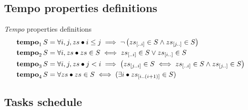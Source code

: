 \documentclass{beamer}
\newcommand{\sliceright}[2]{\ensuremath #1_{\left[..#2\right]}}
\newcommand{\sliceleft}[2]{\ensuremath #1_{\left[#2..\right]}}
\newcommand{\slice}[3]{\ensuremath #1_{\left[#2..#3\right]}}
\def\tempoop{\ensuremath\operatorname{\mathbf{tempo}}}
\newcommand{\tempo}[2][1-4]{\ensuremath\tempoop_{#1} #2}
\begin{document}
\subsection{Tempo properties definitions}

\begin{frame}[label=tempodetail]{\emph{Tempo} properties definitions}
	{\scriptsize\begin{align*}
			\tempo[1]{S} &= \forall i, j, zs \bullet
			  i \le j \implies
			  \lnot \left(
			    \sliceright{zs}{i} \in S \land \sliceleft{zs}{j} \in S
			  \right)\\
			\tempo[2]{S} &= \forall i, zs \bullet
			  zs \in S \iff
			  \sliceright{zs}{i} \in S \lor \sliceleft{zs}{i} \in S\\
			\tempo[3]{S} &= \forall i, j, zs \bullet
			  j < i \implies
			  \left(
			    \slice{zs}{j}{i} \in S \iff \sliceright{zs}{i} \in S \land \sliceleft{zs}{j} \in S
			  \right)\\
			\tempo[4]{S} &= \forall zs \bullet zs \in S \iff (\exists i \bullet \slice{zs}{i}{\left(i+1\right)} \in S)
		\end{align*}}
	\hyperlink{tempo}{}
\end{frame}

\subsection{Tasks schedule}
\end{document}
